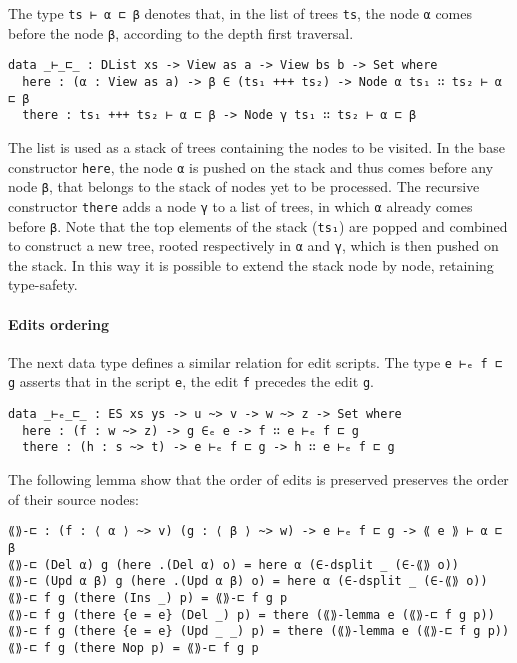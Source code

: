 \documentclass[../Thesis.tex]{subfiles}
\begin{document}
	The type \texttt{ts ⊢ α ⊏ β} denotes that, in the list of trees \texttt{ts}, 
	the node \texttt{α} comes before the node \texttt{β}, according to the
	depth first traversal.
	
\begin{verbatim}
data _⊢_⊏_ : DList xs -> View as a -> View bs b -> Set where
  here : (α : View as a) -> β ∈ (ts₁ +++ ts₂) -> Node α ts₁ ∷ ts₂ ⊢ α ⊏ β
  there : ts₁ +++ ts₂ ⊢ α ⊏ β -> Node γ ts₁ ∷ ts₂ ⊢ α ⊏ β
\end{verbatim}

	The list is used as a stack of trees containing the nodes to be visited.
	In the base constructor \texttt{here}, the node \texttt{α} is pushed on the 
	stack and thus comes before any node \texttt{β}, that belongs to the
	stack of nodes yet to be processed.
	The recursive constructor \texttt{there} adds a node \texttt{γ} to a list of 
	trees, in which \texttt{α} already comes before \texttt{β}.
	Note that the top elements of the stack (\texttt{ts₁}) are popped 
	and combined to construct a new tree, rooted respectively 
	in \texttt{α} and \texttt{γ}, which is then pushed on the stack. 
	In this way it is possible to extend the stack node by node, 
	retaining type-safety. 
	
	\paragraph{Edits ordering}
	The next data type defines a similar relation for edit scripts.
	The type \texttt{e ⊢ₑ f ⊏ g} asserts that in the script \texttt{e}, the edit
	\texttt{f} precedes the edit \texttt{g}.
	
\begin{verbatim}
data _⊢ₑ_⊏_ : ES xs ys -> u ~> v -> w ~> z -> Set where
  here : (f : w ~> z) -> g ∈ₑ e -> f ∷ e ⊢ₑ f ⊏ g 
  there : (h : s ~> t) -> e ⊢ₑ f ⊏ g -> h ∷ e ⊢ₑ f ⊏ g 
\end{verbatim}

	The following lemma show that the order of edits is preserved
	preserves the order of their source nodes:	
\begin{verbatim}
⟪⟫-⊏ : (f : ⟨ α ⟩ ~> v) (g : ⟨ β ⟩ ~> w) -> e ⊢ₑ f ⊏ g -> ⟪ e ⟫ ⊢ α ⊏ β
⟪⟫-⊏ (Del α) g (here .(Del α) o) = here α (∈-dsplit _ (∈-⟪⟫ o))
⟪⟫-⊏ (Upd α β) g (here .(Upd α β) o) = here α (∈-dsplit _ (∈-⟪⟫ o))
⟪⟫-⊏ f g (there (Ins _) p) = ⟪⟫-⊏ f g p
⟪⟫-⊏ f g (there {e = e} (Del _) p) = there (⟪⟫-lemma e (⟪⟫-⊏ f g p))
⟪⟫-⊏ f g (there {e = e} (Upd _ _) p) = there (⟪⟫-lemma e (⟪⟫-⊏ f g p))
⟪⟫-⊏ f g (there Nop p) = ⟪⟫-⊏ f g p
\end{verbatim}
\end{document}
